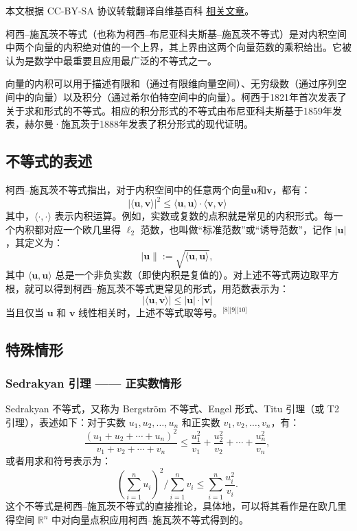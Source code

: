 
本文根据 CC-BY-SA 协议转载翻译自维基百科 \href{https://en.wikipedia.org/wiki/Cauchy\%E2\%80\%93Schwarz_inequality}{相关文章}。

柯西–施瓦茨不等式（也称为柯西–布尼亚科夫斯基–施瓦茨不等式）是对内积空间中两个向量的内积绝对值的一个上界，其上界由这两个向量范数的乘积给出。它被认为是数学中最重要且应用最广泛的不等式之一。

向量的内积可以用于描述有限和（通过有限维向量空间）、无穷级数（通过序列空间中的向量）以及积分（通过希尔伯特空间中的向量）。柯西于1821年首次发表了关于求和形式的不等式。相应的积分形式的不等式由布尼亚科夫斯基于1859年发表，赫尔曼·施瓦茨于1888年发表了积分形式的现代证明。
\subsection{不等式的表述}
柯西–施瓦茨不等式指出，对于内积空间中的任意两个向量$\mathbf{u}$和$\mathbf{v}$，都有：
$$
|\langle \mathbf{u}, \mathbf{v} \rangle|^2 \leq \langle \mathbf{u}, \mathbf{u} \rangle \cdot \langle \mathbf{v}, \mathbf{v} \rangle~
$$
其中，$\langle \cdot , \cdot \rangle$ 表示内积运算。例如，实数或复数的点积就是常见的内积形式。每一个内积都对应一个欧几里得 $\ell_2$ 范数，也叫做“标准范数”或“诱导范数”，记作 $|\mathbf{u}|$，其定义为：
$$
|\mathbf{u}\| := \sqrt{\langle \mathbf{u}, \mathbf{u} \rangle},~
$$
其中 $\langle \mathbf{u}, \mathbf{u} \rangle$ 总是一个非负实数（即使内积是复值的）。对上述不等式两边取平方根，就可以得到柯西–施瓦茨不等式更常见的形式，用范数表示为：
$$
|\langle \mathbf{u}, \mathbf{v} \rangle| \leq |\mathbf{u}| \cdot |\mathbf{v}|~
$$
当且仅当 $\mathbf{u}$ 和 $\mathbf{v}$ 线性相关时，上述不等式取等号。\(^\text{[8][9][10]}\)
\subsection{特殊情形}
\subsubsection{Sedrakyan 引理 —— 正实数情形}
Sedrakyan 不等式，又称为 Bergström 不等式、Engel 形式、Titu 引理（或 T2 引理），表述如下：对于实数 $u_1, u_2, \dots, u_n$ 和正实数 $v_1, v_2, \dots, v_n$，有：
$$
\frac{(u_1 + u_2 + \cdots + u_n)^2}{v_1 + v_2 + \cdots + v_n} \leq \frac{u_1^2}{v_1} + \frac{u_2^2}{v_2} + \cdots + \frac{u_n^2}{v_n},~
$$
或者用求和符号表示为：
$$
\left( \sum_{i=1}^{n} u_i \right)^2 \bigg/ \sum_{i=1}^{n} v_i \leq \sum_{i=1}^{n} \frac{u_i^2}{v_i}.~
$$
这个不等式是柯西–施瓦茨不等式的直接推论，具体地，可以将其看作是在欧几里得空间 $\mathbb{R}^n$ 中对向量点积应用柯西–施瓦茨不等式得到的。

